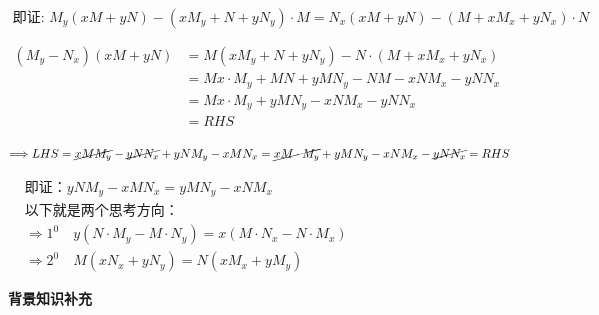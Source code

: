 \documentclass[fontset=windows]{article}
\begin{document}
    \vspace*{1em}
    \noindent$\text{ 即证: } M_y(x M+y N)-\left(x M_y+N+y N_y\right) \cdot M=N_x(x M+y N)-\left(M+x M_x+y N_x\right) \cdot N$
    
    \noindent$
    \begin{aligned}
        (M_y-N_x)(x M+y N)&=M(x M_y+N+y N_y)-N\cdot(M+x M_x+y N_x)\\
        &=M x \cdot M_y+{M N}+y M N_y-{N M}-x N M_x-y N N_x\\
        &=M x \cdot M_y+y M N_y-x N M_x-y N N_x\\
        & = RHS
    \end{aligned}
    $
    
    \noindent $
    \Longrightarrow L H S= \cancel {x M M_y} - \cancel{y N N_x} + y N M_y - x M N_x = \cancel{ x M \cdot M_y} + y M N_y-x N M_x- \cancel{y N N_x} = RHS
    $

    \noindent$
    \begin{aligned}
        &\text {即证：} y N M_y - x M N_x = y M N_y - x N M_x\\
        &\text{以下就是两个思考方向：}\\
        &\Rightarrow 1^0 \quad y(N\cdot M_y - M\cdot N_y) = x(M\cdot N_x - N\cdot M_x)\\
        &\Rightarrow 2^0 \quad M\left(x N_x+y N_y\right)=N\left(x M_x+y M_y\right)
    \end{aligned}
    $
    
    \vspace*{1em}
    \noindent\textbf{背景知识补充}
\end{document}
